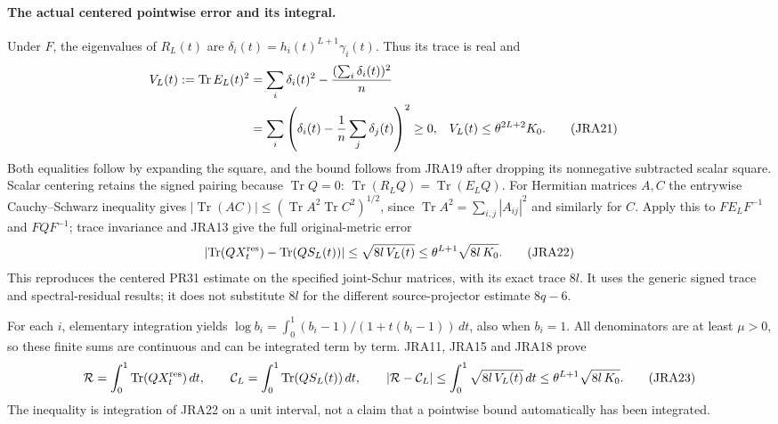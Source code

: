 \documentclass[11pt,a4paper]{article}
\newcommand{\Tr}{\operatorname{Tr}}
\begin{document}
\paragraph{The actual centered pointwise error and its integral.}
Under $F$, the eigenvalues of $R_L(t)$ are
$\delta_i(t)=h_i(t)^{L+1}\gamma_i(t)$. Thus its trace is real and
\begin{align}
 V_L(t):=\Tr E_L(t)^2
 &=\sum_i\delta_i(t)^2-\frac{(\sum_i\delta_i(t))^2}{n}\notag\\
 &=\sum_i\left(\delta_i(t)-\frac1n\sum_j\delta_j(t)\right)^2\geq0,
 &V_L(t)&\leq\theta^{2L+2}K_0.
 \tag{JRA21}
\end{align}
Both equalities follow by expanding the square, and the bound follows
from JRA19 after dropping its nonnegative subtracted scalar square.
Scalar centering retains the signed pairing because $\Tr Q=0$:
$\Tr(R_LQ)=\Tr(E_LQ)$. For Hermitian matrices $A,C$ the entrywise
Cauchy--Schwarz inequality gives
$|\Tr(AC)|\leq(\Tr A^2\Tr C^2)^{1/2}$, since
$\Tr A^2=\sum_{i,j}|A_{ij}|^2$ and similarly for $C$.
Apply this to $FE_LF^{-1}$ and $FQF^{-1}$; trace invariance and JRA13 give
the full original-metric error
\begin{equation}
 \left|\Tr(QX_t^{\rm res})-\Tr(QS_L(t))\right|
 \leq\sqrt{8l\,V_L(t)}
 \leq\theta^{L+1}\sqrt{8l\,K_0}.
 \tag{JRA22}
\end{equation}
This reproduces the centered PR31 estimate on the specified joint-Schur
matrices, with its exact trace $8l$. It uses the generic signed trace
and spectral-residual results; it does not substitute $8l$ for the
different source-projector estimate $8q-6$.

For each $i$, elementary integration yields
$\log b_i=\int_0^1(b_i-1)/(1+t(b_i-1))\,dt$, also when $b_i=1$.
All denominators are at least $\mu>0$, so these finite sums are continuous
and can be integrated term by term. JRA11, JRA15 and JRA18 prove
\begin{equation}
 \mathcal R=\int_0^1\Tr(QX_t^{\rm res})\,dt,\qquad
 \mathcal C_L=\int_0^1\Tr(QS_L(t))\,dt,
 \qquad
 |\mathcal R-\mathcal C_L|
 \leq\int_0^1\sqrt{8l\,V_L(t)}\,dt
 \leq\theta^{L+1}\sqrt{8l\,K_0}.
 \tag{JRA23}
\end{equation}
The inequality is integration of JRA22 on a unit interval, not a
claim that a pointwise bound automatically has been integrated.
\end{document}
